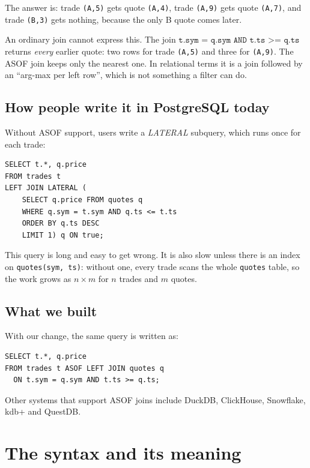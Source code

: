 \documentclass[11pt,a4paper]{article}
\newcommand{\code}[1]{\texttt{#1}}
\begin{document}
\noindent The answer is: trade \code{(A,5)} gets quote \code{(A,4)}, trade \code{(A,9)}
gets quote \code{(A,7)}, and trade \code{(B,3)} gets nothing, because the only B quote
comes later.

An ordinary join cannot express this. The join
$\texttt{t.sym = q.sym AND t.ts >= q.ts}$ returns \emph{every} earlier quote: two rows for
trade \code{(A,5)} and three for \code{(A,9)}. The ASOF join keeps only the nearest one.
In relational terms it is a join followed by an ``arg-max per left row'', which is not
something a filter can do.

\subsection{How people write it in PostgreSQL today}

Without ASOF support, users write a \emph{LATERAL} subquery, which runs once for each
trade:

\begin{lstlisting}
SELECT t.*, q.price
FROM trades t
LEFT JOIN LATERAL (
    SELECT q.price FROM quotes q
    WHERE q.sym = t.sym AND q.ts <= t.ts
    ORDER BY q.ts DESC
    LIMIT 1) q ON true;
\end{lstlisting}

This query is long and easy to get wrong. It is also slow unless there is an index on
\code{quotes(sym, ts)}: without one, every trade scans the whole \code{quotes} table, so
the work grows as $n \times m$ for $n$ trades and $m$ quotes.

\subsection{What we built}

With our change, the same query is written as:

\begin{lstlisting}
SELECT t.*, q.price
FROM trades t ASOF LEFT JOIN quotes q
  ON t.sym = q.sym AND t.ts >= q.ts;
\end{lstlisting}

Other systems that support ASOF joins include DuckDB, ClickHouse, Snowflake, kdb+ and
QuestDB.

\section{The syntax and its meaning}
\end{document}
